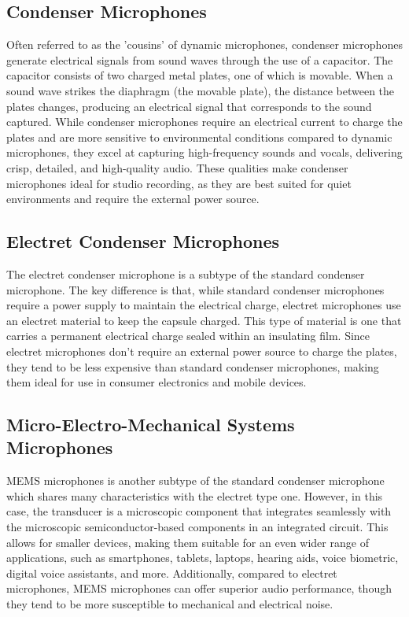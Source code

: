 \subsection{Condenser Microphones}
Often referred to as the 'cousins' of dynamic microphones, condenser microphones generate electrical signals from sound waves through the use of a capacitor.
The capacitor consists of two charged metal plates, one of which is movable.
When a sound wave strikes the diaphragm (the movable plate), the distance between the plates changes, producing an electrical signal that corresponds to the sound captured.
While condenser microphones require an electrical current to charge the plates and are more sensitive to environmental conditions compared to dynamic microphones, they excel at capturing high-frequency sounds and vocals, delivering crisp, detailed, and high-quality audio.
These qualities make condenser microphones ideal for studio recording, as they are best suited for quiet environments and require the external power source.
\subsection{Electret Condenser Microphones}
The electret condenser microphone is a subtype of the standard condenser microphone.
The key difference is that, while standard condenser microphones require a power supply to maintain the electrical charge, electret microphones use an electret material to keep the capsule charged.
This type of material is one that carries a permanent electrical charge sealed within an insulating film.
Since electret microphones don’t require an external power source to charge the plates, they tend to be less expensive than standard condenser microphones, making them ideal for use in consumer electronics and mobile devices.
\subsection{Micro-Electro-Mechanical Systems Microphones}
MEMS microphones is another subtype of the standard condenser microphone which shares many characteristics with the electret type one.
However, in this case, the transducer is a microscopic component that integrates seamlessly with the microscopic semiconductor-based components in an integrated circuit.
This allows for smaller devices, making them suitable for an even wider range of applications, such as smartphones, tablets, laptops, hearing aids, voice biometric, digital voice assistants, and more.
Additionally, compared to electret microphones, MEMS microphones can offer superior audio performance, though they tend to be more susceptible to mechanical and electrical noise.

